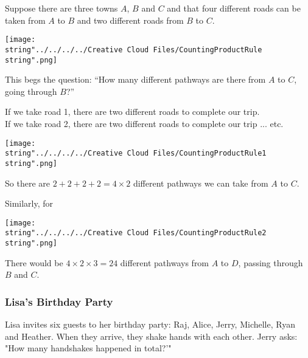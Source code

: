 \documentclass[11pt,a4paper]{book}
\begin{document}
Suppose there are three towns $A$, $B$ and $C$ and that four different
roads can be taken from $A$ to $B$ and two different roads from
$B$ to $C$.
\begin{center}
\texttt{[image: \\string"../../../../Creative Cloud Files/CountingProductRule\\string".png]}
\par\end{center}

This begs the question: ``How many different pathways are there from
$A$ to $C$, going through $B$?''

\begin{minipage}[t]{0.5\textwidth}

If we take road 1, there are two different roads to complete our trip.\\

If we take road 2, there are two different roads to complete our trip
... etc.\\

\end{minipage}
\begin{minipage}[t]{0.2\textwidth}
\begin{center}
\texttt{[image: \\string"../../../../Creative Cloud Files/CountingProductRule1\\string".png]}
\par\end{center}

\end{minipage}

So there are $2+2+2+2=4\times2$ different pathways we can take from
$A$ to $C$.

\newpage

Similarly, for
\begin{center}
\texttt{[image: \\string"../../../../Creative Cloud Files/CountingProductRule2\\string".png]}
\par\end{center}

There would be $4\times2\times3=24$ different pathways from $A$
to $D$, passing through $B$ and $C$.

\subsubsection{Lisa's Birthday Party}

Lisa invites six guests to her birthday party: Raj, Alice, Jerry,
Michelle, Ryan and Heather. When they arrive, they shake hands with
each other. Jerry asks: "How many handshakes happened in total?'"
\end{document}
